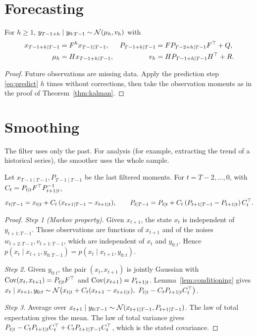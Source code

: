 \documentclass[11pt,a4paper]{article}
\begin{document}
\section{Forecasting}

\begin{proposition}\label{prop:forecast}
For $h\ge1$, $y_{T-1+h}\mid y_{0:T-1}\sim\mathcal{N}(\mu_h,v_h)$ with
\begin{align*}
  x_{T-1+h\mid T-1} &= F^h x_{T-1\mid T-1}, & P_{T-1+h\mid T-1} &= F P_{T-2+h\mid T-1} F^\top + Q,\\
  \mu_h &= Hx_{T-1+h\mid T-1}, & v_h &= HP_{T-1+h\mid T-1}H^\top+R .
\end{align*}
\end{proposition}
\begin{proof}
Future observations are missing data. Apply the prediction step
\eqref{eq:predict} $h$ times without corrections, then take the observation
moments as in the proof of Theorem~\ref{thm:kalman}.
\end{proof}

\section{Smoothing}

The filter uses only the past. For analysis (for example, extracting the trend
of a historical series), the smoother uses the whole sample.

\begin{theorem}\label{thm:rts}
Let $x_{T-1\mid T-1}, P_{T-1\mid T-1}$ be the last filtered moments. For
$t=T-2,\dots,0$, with $C_t = P_{t\mid t}F^\top P_{t+1\mid t}^{-1}$,
\[
  x_{t\mid T-1} = x_{t\mid t} + C_t\,(x_{t+1\mid T-1}-x_{t+1\mid t}),\qquad
  P_{t\mid T-1} = P_{t\mid t} + C_t\,(P_{t+1\mid T-1}-P_{t+1\mid t})\,C_t^\top .
\]
\end{theorem}
\begin{proof}
\emph{Step 1 (Markov property).} Given $x_{t+1}$, the state $x_t$ is
independent of $y_{t+1:T-1}$. Those observations are functions of $x_{t+1}$ and
of the noises $w_{t+2:T-1},v_{t+1:T-1}$, which are independent of $x_t$ and
$y_{0:t}$. Hence $p(x_t\mid x_{t+1},y_{0:T-1})=p(x_t\mid x_{t+1},y_{0:t})$.

\emph{Step 2.} Given $y_{0:t}$, the pair $(x_t,x_{t+1})$ is jointly Gaussian with
$\operatorname{Cov}(x_t,x_{t+1})=P_{t\mid t}F^\top$ and $\operatorname{Cov}(x_{t+1})=P_{t+1\mid t}$.
Lemma~\ref{lem:conditioning} gives
$x_t\mid x_{t+1},y_{0:t}\sim\mathcal{N}\big(x_{t\mid t}+C_t(x_{t+1}-x_{t+1\mid t}),\ P_{t\mid t}-C_tP_{t+1\mid t}C_t^\top\big)$.

\emph{Step 3.} Average over $x_{t+1}\mid y_{0:T-1}\sim\mathcal{N}(x_{t+1\mid T-1},P_{t+1\mid T-1})$.
The law of total expectation gives the mean. The law of total variance gives
$P_{t\mid t}-C_tP_{t+1\mid t}C_t^\top + C_tP_{t+1\mid T-1}C_t^\top$, which is the
stated covariance.
\end{proof}
\end{document}
